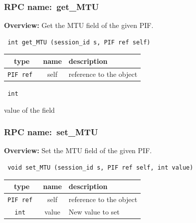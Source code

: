 \subsubsection{RPC name:~get\_MTU}

{\bf Overview:} 
Get the MTU field of the given PIF.

\begin{verbatim} int get_MTU (session_id s, PIF ref self)\end{verbatim}



 
\vspace{0.3cm}
\begin{tabular}{|c|c|p{7cm}|}
 \hline
{\bf type} & {\bf name} & {\bf description} \\ \hline
{\tt PIF ref } & self & reference to the object \\ \hline 

\end{tabular}

\vspace{0.3cm}

{\tt 
int
}


value of the field
\vspace{0.3cm}
\vspace{0.3cm}
\vspace{0.3cm}
\subsubsection{RPC name:~set\_MTU}

{\bf Overview:} 
Set the MTU field of the given PIF.

\begin{verbatim} void set_MTU (session_id s, PIF ref self, int value)\end{verbatim}



 
\vspace{0.3cm}
\begin{tabular}{|c|c|p{7cm}|}
 \hline
{\bf type} & {\bf name} & {\bf description} \\ \hline
{\tt PIF ref } & self & reference to the object \\ \hline 

{\tt int } & value & New value to set \\ \hline 

\end{tabular}

